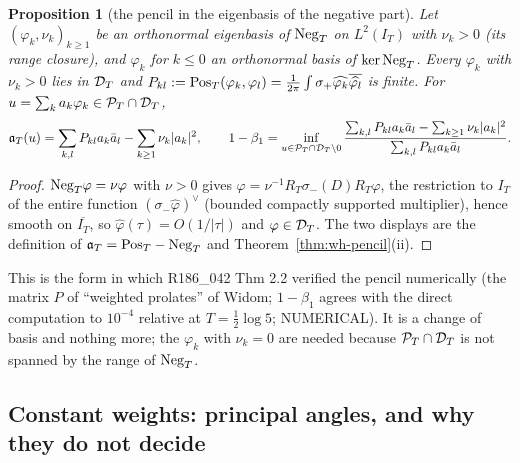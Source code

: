 \documentclass[11pt]{amsart}
\newtheorem{proposition}[theorem]{Proposition}
\theoremstyle{definition}
\theoremstyle{remark}
\newcommand{\PT}{\mathcal P_T}
\newcommand{\IT}{I_T}
\begin{document}
\begin{proposition}[the pencil in the eigenbasis of the negative part]\label{prop:wh-basis}
Let $(\varphi_k,\nu_k)_{k\ge1}$ be an orthonormal eigenbasis of $\mathrm{Neg}_T$ on $L^2(\IT)$ with $\nu_k>0$
(its range closure), and $\varphi_k$ for $k\le0$ an orthonormal basis of $\ker\mathrm{Neg}_T$. Every $\varphi_k$ with
$\nu_k>0$ lies in $\mathcal D_T$ and $P_{kl}:=\mathrm{Pos}_T(\varphi_k,\varphi_l)=\frac1{2\pi}\int\sigma_+\widehat{\varphi_k}\overline{\widehat{\varphi_l}}$
is finite. For $u=\sum_ka_k\varphi_k\in\PT\cap\DT$,
\[
\fa(u)=\sum_{k,l}P_{kl}a_k\bar a_l-\sum_{k\ge1}\nu_k|a_k|^2,\qquad
1-\beta_1=\inf_{u\in\PT\cap\DT\setminus0}\frac{\sum_{k,l}P_{kl}a_k\bar a_l-\sum_{k\ge1}\nu_k|a_k|^2}{\sum_{k,l}P_{kl}a_k\bar a_l}.
\]
\end{proposition}
\begin{proof}
$\mathrm{Neg}_T\varphi=\nu\varphi$ with $\nu>0$ gives $\varphi=\nu^{-1}R_T\sigma_-(D)R_T\varphi$, the restriction to $\IT$ of the
entire function $(\sigma_-\widehat\varphi)^\vee$ (bounded compactly supported multiplier), hence smooth on $\overline{\IT}$,
so $\widehat\varphi(\tau)=O(1/|\tau|)$ and $\varphi\in\mathcal D_T$. The two displays are the definition of $\mathfrak a_T=\mathrm{Pos}_T-\mathrm{Neg}_T$ and
Theorem~\ref{thm:wh-pencil}(ii).
\end{proof}
This is the form in which R186\_042 Thm 2.2 verified the pencil numerically (the matrix $P$ of
``weighted prolates'' of Widom; $1-\beta_1$ agrees with the direct computation to $10^{-4}$ relative at
$T=\frac12\log5$; NUMERICAL). It is a change of basis and nothing more; the $\varphi_k$ with $\nu_k=0$ are
needed because $\PT\cap\DT$ is not spanned by the range of $\mathrm{Neg}_T$.

\subsection{Constant weights: principal angles, and why they do not decide}\label{subsec:wh-angles}
\end{document}
